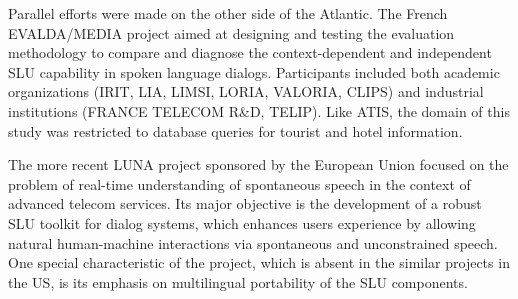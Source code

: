 Parallel efforts were made on the other side of the Atlantic. The French EVALDA/MEDIA
project aimed at designing and testing the evaluation methodology to compare and
diagnose the context-dependent and independent SLU capability in spoken language dialogs.
Participants included both academic organizations (IRIT, LIA, LIMSI, LORIA, VALORIA,
CLIPS) and industrial institutions (FRANCE TELECOM R\&D, TELIP). Like ATIS, the
domain of this study was restricted to database queries for tourist and hotel information.

The more recent LUNA project sponsored by the European Union focused on the
problem of real-time understanding of spontaneous speech in the context of advanced
telecom services. Its major objective is the development of a robust SLU toolkit for dialog
systems, which enhances users experience by allowing natural human-machine interactions
via spontaneous and unconstrained speech. One special characteristic of the project, which
is absent in the similar projects in the US, is its emphasis on multilingual portability of the
SLU components.


